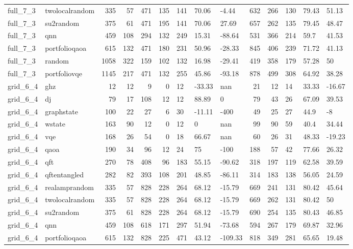 \begin{longtable}{llrrrrlllrrlll}
full\_7\_3 & twolocalrandom & 335 & 57 & 471 & 135 & 141 & 70.06 & -4.44 & 632 & 266 & 130 & 79.43 & 51.13 \\
full\_7\_3 & su2random & 375 & 61 & 471 & 195 & 141 & 70.06 & 27.69 & 657 & 262 & 135 & 79.45 & 48.47 \\
full\_7\_3 & qnn & 459 & 108 & 294 & 132 & 249 & 15.31 & -88.64 & 531 & 366 & 214 & 59.7 & 41.53 \\
full\_7\_3 & portfolioqaoa & 615 & 132 & 471 & 180 & 231 & 50.96 & -28.33 & 845 & 406 & 239 & 71.72 & 41.13 \\
full\_7\_3 & random & 1058 & 322 & 159 & 102 & 132 & 16.98 & -29.41 & 419 & 358 & 179 & 57.28 & 50 \\
full\_7\_3 & portfoliovqe & 1145 & 217 & 471 & 132 & 255 & 45.86 & -93.18 & 878 & 499 & 308 & 64.92 & 38.28 \\
grid\_6\_4 & ghz & 12 & 12 & 9 & 0 & 12 & -33.33 & nan & 21 & 12 & 14 & 33.33 & -16.67 \\
grid\_6\_4 & dj & 79 & 17 & 108 & 12 & 12 & 88.89 & 0 & 79 & 43 & 26 & 67.09 & 39.53 \\
grid\_6\_4 & graphstate & 100 & 22 & 27 & 6 & 30 & -11.11 & -400 & 49 & 25 & 27 & 44.9 & -8 \\
grid\_6\_4 & wstate & 163 & 90 & 12 & 0 & 12 & 0 & nan & 99 & 90 & 59 & 40.4 & 34.44 \\
grid\_6\_4 & vqe & 168 & 26 & 54 & 0 & 18 & 66.67 & nan & 60 & 26 & 31 & 48.33 & -19.23 \\
grid\_6\_4 & qaoa & 190 & 34 & 96 & 12 & 24 & 75 & -100 & 188 & 57 & 42 & 77.66 & 26.32 \\
grid\_6\_4 & qft & 270 & 78 & 408 & 96 & 183 & 55.15 & -90.62 & 318 & 197 & 119 & 62.58 & 39.59 \\
grid\_6\_4 & qftentangled & 282 & 82 & 393 & 108 & 201 & 48.85 & -86.11 & 314 & 183 & 138 & 56.05 & 24.59 \\
grid\_6\_4 & realamprandom & 335 & 57 & 828 & 228 & 264 & 68.12 & -15.79 & 669 & 241 & 131 & 80.42 & 45.64 \\
grid\_6\_4 & twolocalrandom & 335 & 57 & 828 & 228 & 264 & 68.12 & -15.79 & 669 & 262 & 131 & 80.42 & 50 \\
grid\_6\_4 & su2random & 375 & 61 & 828 & 228 & 264 & 68.12 & -15.79 & 690 & 254 & 135 & 80.43 & 46.85 \\
grid\_6\_4 & qnn & 459 & 108 & 618 & 171 & 297 & 51.94 & -73.68 & 594 & 267 & 179 & 69.87 & 32.96 \\
grid\_6\_4 & portfolioqaoa & 615 & 132 & 828 & 225 & 471 & 43.12 & -109.33 & 818 & 349 & 281 & 65.65 & 19.48 \\

\end{longtable}
